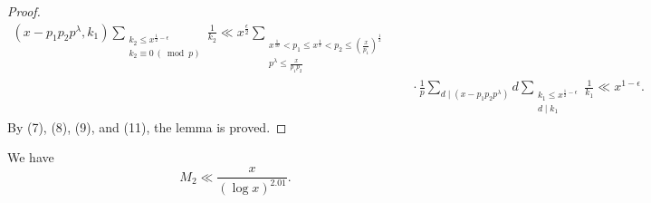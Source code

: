 \begin{proof}
\begin{align*}
(x-p_1p_2p^\lambda,k_1)\sum_{\substack{k_2\leqslant x^{\frac12-\epsilon}\\k_2\equiv0\,(\bmod p)}}\frac1{k_2}
\ll x^{\frac{\epsilon}2}\sum_{\substack{x^{\frac1{10}}<p_1\leqslant x^{\frac13}<p_2\leqslant(\frac{x}{p_1})^{\frac12}\\p^\lambda\leqslant\frac{x}{p_1p_2}}}\\
&\quad\cdot\frac1p\sum_{d\mid(x-p_1p_2p^\lambda)}d\sum_{\substack{k_1\leqslant x^{\frac12-\epsilon}\\d\mid k_1}}\frac1{k_1}\ll x^{1-\epsilon}.\tag{11}
\end{align*}
By (7), (8), (9), and (11), the lemma is proved.
\end{proof}

\begin{lemma}
We have
\[
M_2\ll\frac{x}{(\log x)^{2.01}}.
\]
\end{lemma}

